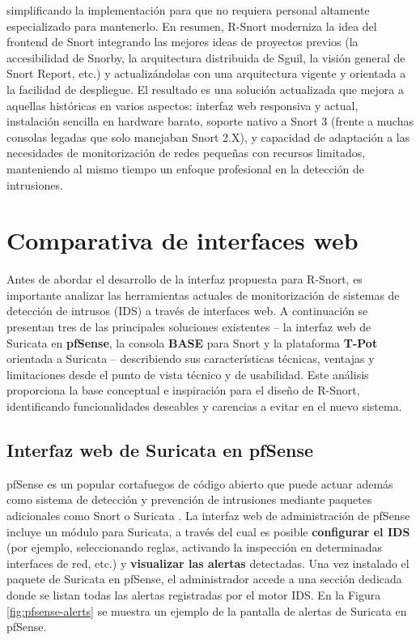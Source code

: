 \documentclass[11pt,a4paper,twoside]{report}
\begin{document}
simplificando la implementación para que no requiera personal altamente especializado para mantenerlo. En resumen, R-Snort moderniza la idea del frontend de Snort integrando las mejores ideas de proyectos previos (la accesibilidad de Snorby, la arquitectura distribuida de Sguil, la visión general de Snort Report, etc.) y actualizándolas con una arquitectura vigente y orientada a la facilidad de despliegue. El resultado es una solución actualizada que mejora a aquellas históricas en varios aspectos: interfaz web responsiva y actual, instalación sencilla en hardware barato, soporte nativo a Snort 3 (frente a muchas consolas legadas que solo manejaban Snort 2.X), y capacidad de adaptación a las necesidades de monitorización de redes pequeñas con recursos limitados, manteniendo al mismo tiempo un enfoque profesional en la detección de intrusiones.

\section{Comparativa de interfaces web}
Antes de abordar el desarrollo de la interfaz propuesta para R-Snort, es importante analizar las herramientas actuales de monitorización de sistemas de detección de intrusos (IDS) a través de interfaces web. A continuación se presentan tres de las principales soluciones existentes -- la interfaz web de Suricata en \textbf{pfSense}, la consola \textbf{BASE} para Snort y la plataforma \textbf{T-Pot} orientada a Suricata -- describiendo sus características técnicas, ventajas y limitaciones desde el punto de vista técnico y de usabilidad. Este análisis proporciona la base conceptual e inspiración para el diseño de R-Snort, identificando funcionalidades deseables y carencias a evitar en el nuevo sistema.\newline

\subsection{Interfaz web de Suricata en pfSense}
pfSense es un popular cortafuegos de código abierto que puede actuar además como sistema de detección y prevención de intrusiones mediante paquetes adicionales como Snort o Suricata \cite{pfsense}. La interfaz web de administración de pfSense incluye un módulo para Suricata, a través del cual es posible \textbf{configurar el IDS} (por ejemplo, seleccionando reglas, activando la inspección en determinadas interfaces de red, etc.) y \textbf{visualizar las alertas} detectadas. Una vez instalado el paquete de Suricata en pfSense, el administrador accede a una sección dedicada donde se listan todas las alertas registradas por el motor IDS. En la Figura \ref{fig:pfsense-alerts} se muestra un ejemplo de la pantalla de alertas de Suricata en pfSense.\newline
\end{document}
